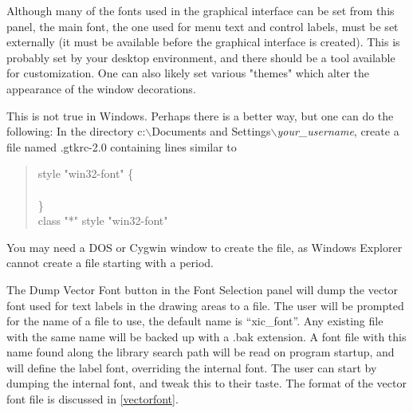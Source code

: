 Although many of the fonts used in the graphical interface can be set
from this panel, the main font, the one used for menu text and control
labels, must be set externally (it must be available before the
graphical interface is created).  This is probably set by your desktop
environment, and there should be a tool available for customization. 
One can also likely set various "themes" which alter the appearance of
the window decorations.

This is not true in Windows.  Perhaps there is a better way, but one
can do the following:  In the directory {\vt c:}$\backslash${\vt Documents
and Settings}$\backslash${\it your\_username}, create a file named {\vt
.gtkrc-2.0} containing lines similar to

\begin{quote}
{\vt style "win32-font"} {\vt \{}\\
\hspace*{2em}{\vt font\_name = "tahoma 12"}\\
{\vt \}}\\
{\vt class "*" style "win32-font"}
\end{quote}

You may need a DOS or Cygwin window to create the file, as
Windows Explorer cannot create a file starting with a period.

The {\cb Dump Vector Font} button in the {\cb Font Selection} panel
will dump the vector font used for text labels in the drawing areas to
a file.  The user will be prompted for the name of a file to use, the
default name is ``{\vt xic\_font}''.  Any existing file with the same
name will be backed up with a {\vt .bak} extension.  A font file with
this name found along the library search path will be read on program
startup, and will define the label font, overriding the internal font. 
The user can start by dumping the internal font, and tweak this to
their taste.  The format of the vector font file is discussed in
\ref{vectorfont}.

